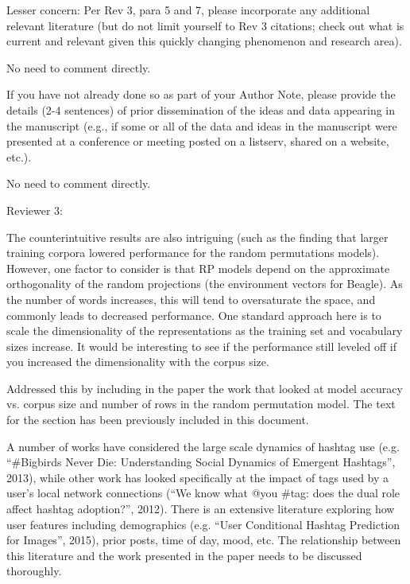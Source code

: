 \documentclass[answers,12pt]{exam}
\begin{document}
\begin{questions}
\question Lesser concern: Per Rev 3, para 5 and 7, please incorporate any additional relevant literature (but do not limit yourself to Rev 3 citations; check out what is current and relevant given this quickly changing phenomenon and research area).

\begin{solution}
No need to comment directly.
\end{solution}

\question If you have not already done so as part of your Author Note, please provide the details (2-4 sentences) of prior dissemination of the ideas and data appearing in the manuscript (e.g., if some or all of the data and ideas in the manuscript were presented at a conference or meeting posted on a listserv, shared on a website, etc.).

\begin{solution}
No need to comment directly.
\end{solution}

Reviewer 3: 

\question The counterintuitive results are also intriguing (such as the finding that larger training corpora lowered performance for the random permutations models). However, one factor to consider is that RP models depend on the approximate orthogonality of the random projections (the environment vectors for Beagle). As the number of words increases, this will tend to oversaturate the space, and commonly leads to decreased performance. One standard approach here is to scale the dimensionality of the representations as the training set and vocabulary sizes increase. It would be interesting to see if the performance still leveled off if you increased the dimensionality with the corpus size.

\begin{solution}
Addressed this by including in the paper the work that looked at model accuracy vs. corpus size and number of rows in the random permutation model.
The text for the section has been previously included in this document.
\end{solution}

\question A number of works have considered the large scale dynamics of hashtag use (e.g. ``\#Bigbirds Never Die: Understanding Social Dynamics of Emergent Hashtags'', 2013), while other work has looked specifically at the impact of tags used by a user's local network connections (``We know what @you \#tag: does the dual role affect hashtag adoption?'', 2012). There is an extensive literature exploring how user features including demographics (e.g. ``User Conditional Hashtag Prediction for Images'', 2015), prior posts, time of day, mood, etc. The relationship between this literature and the work presented in the paper needs to be discussed thoroughly.


\end{questions}
\end{document}
